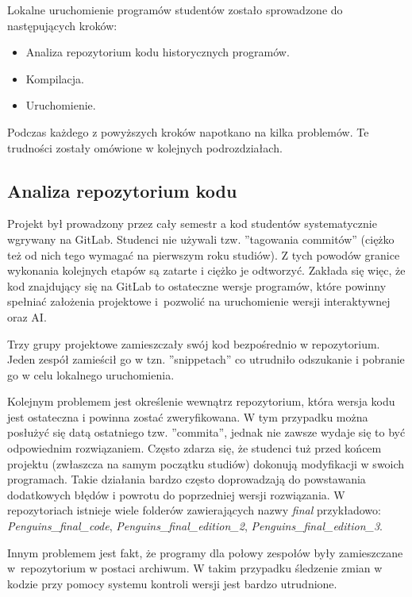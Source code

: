 Lokalne uruchomienie programów studentów zostało sprowadzone do następujących kroków:
\begin{itemize}
    \item Analiza repozytorium kodu historycznych programów.
    \item Kompilacja.
    \item Uruchomienie.
\end{itemize}

Podczas każdego z powyższych kroków napotkano na kilka problemów.
Te trudności zostały omówione w kolejnych podrozdziałach.

\subsection{Analiza repozytorium kodu}

Projekt był prowadzony przez cały semestr a kod studentów systematycznie wgrywany na GitLab.
Studenci nie używali tzw. ”tagowania commitów” (ciężko też od nich tego wymagać na pierwszym roku studiów).
Z tych powodów granice wykonania kolejnych etapów są zatarte i ciężko je odtworzyć.
Zakłada się więc, że kod znajdujący się na GitLab to ostateczne wersje programów, które powinny spełniać założenia projektowe i~pozwolić na uruchomienie wersji interaktywnej oraz AI.

Trzy grupy projektowe zamieszczały swój kod bezpośrednio w repozytorium.
Jeden zespół zamieścił go w tzn. ”snippetach” co utrudniło odszukanie i pobranie go w celu lokalnego uruchomienia.

Kolejnym problemem jest określenie wewnątrz repozytorium, która wersja kodu jest ostateczna i powinna zostać zweryfikowana.
W tym przypadku można posłużyć się datą ostatniego tzw. ”commita”, jednak nie zawsze wydaje się to być odpowiednim rozwiązaniem.
Często zdarza się, że studenci tuż przed końcem projektu (zwłaszcza na samym początku studiów) dokonują modyfikacji w swoich programach.
Takie działania bardzo często doprowadzają do powstawania dodatkowych błędów i powrotu do poprzedniej wersji rozwiązania.
W repozytoriach istnieje wiele folderów zawierających nazwy \textit{final} przykładowo: \textit{Penguins\_final\_code}, \textit{Penguins\_final\_edition\_2}, \textit{Penguins\_final\_edition\_3}.

Innym problemem jest fakt, że programy dla połowy zespołów były zamieszczane w~repozytorium w postaci archiwum.
W takim przypadku śledzenie zmian w kodzie przy pomocy systemu kontroli wersji jest bardzo utrudnione.

